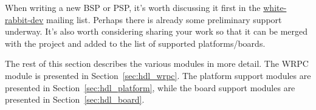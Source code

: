 When writing a new BSP or PSP, it's worth discussing it first in the
\href{http://www.ohwr.org/mailing_list/show?project_id=white-rabbit}{white-rabbit-dev} mailing
list. Perhaps there is already some preliminary support underway. It's also worth considering
sharing your work so that it can be merged with the project and added to the list of supported
platforms/boards.

The rest of this section describes the various modules in more detail. The WRPC module is presented
in Section~\ref{sec:hdl_wrpc}. The platform support modules are presented in
Section~\ref{sec:hdl_platform}, while the board support modules are presented in
Section~\ref{sec:hdl_board}.

